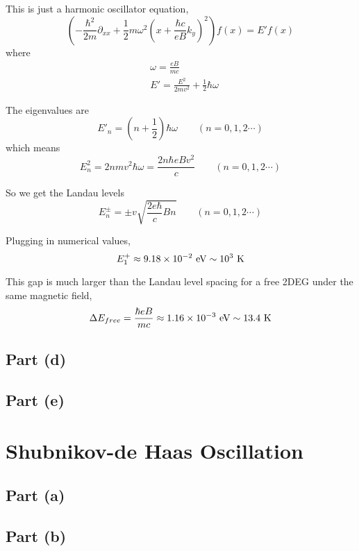 \documentclass{article}
\begin{document}
This is just a harmonic oscillator equation,
\begin{equation*}
\left(-\frac{\hbar^2}{2m}\partial_{xx}+\frac{1}{2}m\omega^2\left(x+\frac{\hbar c}{eB}k_y\right)^2\right)f(x)=E'f(x)
\end{equation*}
where
\begin{align*}
&\omega=\frac{eB}{mc}\\
&E'=\frac{E^2}{2mv^2}+\frac{1}{2}\hbar\omega
\end{align*}

The eigenvalues are
\begin{equation*}
E'_n=\left(n+\frac{1}{2}\right)\hbar\omega\quad\quad(n=0,1,2\cdots)
\end{equation*}
which means
\begin{equation*}
E^2_n=2nmv^2\hbar\omega=\frac{2n\hbar eBv^2}{c}\quad\quad(n=0,1,2\cdots)
\end{equation*}

So we get the Landau levels
\begin{equation*}
E_n^{\pm}=\pm v\sqrt{\frac{2e\hbar}{c}Bn}\quad\quad(n=0,1,2\cdots)
\end{equation*}

Plugging in numerical values,
\begin{equation*}
E_1^+\approx9.18\times10^{-2}\textup{ eV}\sim10^3\textup{ K}
\end{equation*}

This gap is much larger than the Landau level spacing for a free 2DEG under the same magnetic field,
\begin{equation*}
\Delta E_{free}=\frac{\hbar eB}{mc}\approx1.16\times10^{-3}\textup{ eV}\sim13.4\textup{ K}
\end{equation*}

\subsection{Part (d)}

\subsection{Part (e)}

\section{Shubnikov-de Haas Oscillation}
\subsection{Part (a)}

\subsection{Part (b)}
\end{document}
